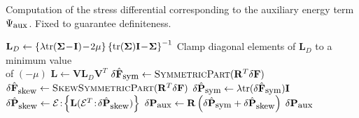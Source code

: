 \begin{algorithm}[h]
\caption{Computation of the stress differential corresponding to the auxiliary energy term $\Psi_{\mbox{\small aux}}$. Fixed to guarantee definiteness.}
\label{alg_indefiniteness_fix}
\begin{algorithmic}[1]
\State $\mathbf{L}_D\gets\left\{\lambda\mbox{tr}(\mathbf{\Sigma}\!-\!\mathbf{I})\!-\!2\mu\right\}\left\{\mbox{tr}(\mathbf{\Sigma})\mathbf{I}\!-\!\mathbf{\Sigma}\right\}^{-1}$
\State Clamp diagonal elements of $\mathbf{L}_D$ to a minimum value \\\nonumber\hspace*{.25in}of $(-\mu)$
\State $\mathbf{L}\gets\mathbf{V}\mathbf{L}_D\mathbf{V}^T$
\EndFunction
{}
\State $\delta\hat{\mathbf{F}}_{\mbox{\small sym}}\gets\Call{SymmetricPart}{\mathbf{R}^T\delta\mathbf{F}}$
\State $\delta\hat{\mathbf{F}}_{\mbox{\small skew}}\gets\Call{SkewSymmetricPart}{\mathbf{R}^T\delta\mathbf{F}}$
\State $\delta\hat{\mathbf{P}}_{\mbox{\small sym}}\gets\lambda\mbox{tr}(\delta\hat{\mathbf{F}}_{\mbox{\small sym}})\mathbf{I}$
\State $\delta\hat{\mathbf{P}}_{\mbox{\small skew}}\gets\mathcal{E}\!:\!\left\{\mathbf{L}(\mathcal{E}^T\!:\!\delta\hat{\mathbf{P}}_{\mbox{\small skew}})\right\}$
\State $\delta\mathbf{P}_{\mbox{\small aux}}\gets\mathbf{R}\left(\delta\hat{\mathbf{P}}_{\mbox{\small sym}}+\delta\hat{\mathbf{P}}_{\mbox{\small skew}}\right)$
\State \Return $\delta\mathbf{P}_{\mbox{\small aux}}$
\EndFunction
\end{algorithmic}
\end{algorithm}



